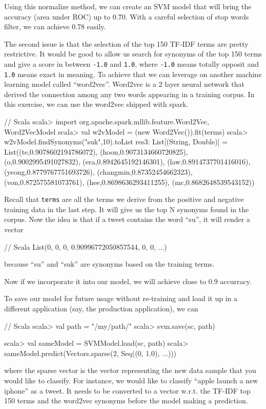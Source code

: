\documentclass[10pt]{article}
\begin{document}
Using this normalize method, we can create an SVM model that will
bring the accuracy (area under ROC) up to 0.70. With a careful
selection of stop words filter, we can achieve 0.78 easily.

The second issue is that the selection of the top 150 TF-IDF terms are
pretty restrictive. It would be good to allow us search for
synonyms of the top 150 terms and give a score in between
{\tt -1.0} and {\tt 1.0}, where {\tt -1.0} means totally opposit and
{\tt 1.0} means exact in meaning. To achieve that we can leverage on
another machine learning model called ``word2vec''. Word2vec is a 2
layer neural network that derived the connection among any two words
appearing in a training corpus. In this exercise, we can use the
word2vec shipped with spark.

\begin{code}
// Scala 
scala> import org.apache.spark.mllib.feature.{Word2Vec, Word2VecModel}
scala> val w2vModel = (new Word2Vec()).fit(terms)
scala> w2vModel.findSynonyms("suk",10).toList
res3: List[(String, Double)] = List((te,0.9078602194786072), 
(hoon,0.9073134660720825), (o,0.9002995491027832), 
(era,0.8942645192146301), (law,0.8914737701416016), 
(yeong,0.8779767751693726), (changmin,0.87352454662323), 
(von,0.872575581073761), (hee,0.8698636293411255), 
(mc,0.8682648539543152))
\end{code}

Recall that {\tt terms} are all the terms we derive from the positive and
negative training data in the last step.
It will give us the top N synonyms found in the corpus. Now the idea
is that if a tweet contains the word ``su'', it will render a vector

\begin{code}
// Scala
List(0, 0, 0, 0.90996772050857544, 0, 0, ...)
\end{code}
because ``su'' and ``suk'' are synonyms based on the training terms.

Now if we incorporate it into our model, we will achieve close to 0.9
accurracy. 

To save our model for future usage without re-training and load it up
in a different application (say, the production application), we can 
\begin{code}
// Scala 
scala> val path = "/my/path/"
scala> svm.save(sc, path)

scala> val sameModel = SVMModel.load(sc, path)
scala> sameModel.predict(Vectors.sparse(2, Seq((0, 1.0), ...)))
\end{code}
%
where the sparse vector is the vector representing the new data sample
that you would like to classify. For instance, we would like to
classify ``apple launch a new iphone'' as a tweet. It needs to be
converted to a vector w.r.t. the TF-IDF top 150 terms and the word2vec
synonyms before the model making a prediction.
\end{document}
